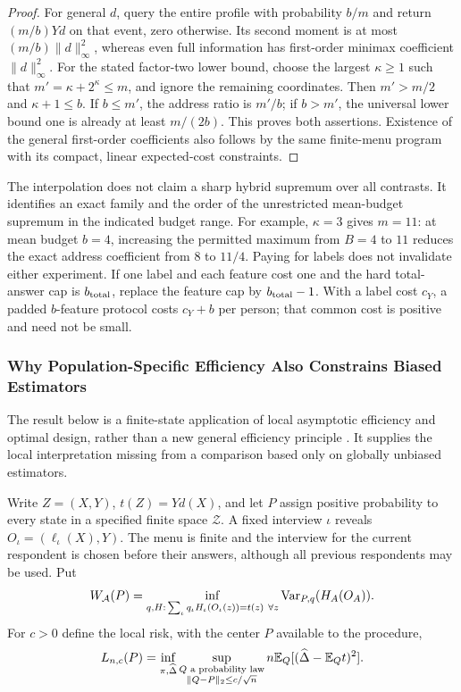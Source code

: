 \begin{proof}
For general $d$, query the entire profile with probability $b/m$ and return
$(m/b)Yd$ on that event, zero otherwise. Its second moment is at most
$(m/b)\|d\|_\infty^2$, whereas even full information has first-order minimax
coefficient $\|d\|_\infty^2$. For the stated factor-two lower bound, choose
the largest $\kappa\ge1$ such that $m'=\kappa+2^\kappa\le m$, and ignore the remaining
coordinates. Then $m'>m/2$ and $\kappa+1\le b$. If $b\le m'$, the address ratio
is $m'/b$; if $b>m'$, the universal lower bound one is already at least
$m/(2b)$. This proves both assertions. Existence of the general
first-order coefficients also follows by the same finite-menu program with
its compact, linear expected-cost constraints.
\end{proof}

The interpolation does not claim a sharp hybrid supremum over all contrasts.
It identifies an exact family and the order of the unrestricted mean-budget
supremum in the indicated budget range. For example, $\kappa=3$ gives $m=11$:
at mean budget $b=4$, increasing the permitted maximum from $B=4$ to $11$
reduces the exact address coefficient from $8$ to $11/4$. Paying for labels
does not invalidate either experiment. If one label and each feature cost
one and the hard total-answer cap is $b_{\rm total}$, replace the feature
cap by $b_{\rm total}-1$. With a label cost $c_Y$, a padded $b$-feature
protocol costs $c_Y+b$ per person; that common cost is positive and need not
be small.

\subsubsection{Why Population-Specific Efficiency Also Constrains Biased Estimators}
\label{app:localminimax}
The result below is a finite-state application of local asymptotic efficiency
and optimal design, rather than a new general efficiency principle
\citep{robins1994,tsiatis2006,hahn2011,barnes2020}. It supplies the local
interpretation missing from a comparison based only on globally unbiased
estimators.

Write $Z=(X,Y)$, $t(Z)=Yd(X)$, and let $P$ assign positive probability to
every state in a specified finite space $\mathcal Z$. A fixed interview
$\iota$ reveals $O_\iota=(\ell_\iota(X),Y)$. The menu is finite and the interview for
the current respondent is chosen before their answers, although all previous
respondents may be used. Put
\[
 W_{\mathcal A}(P)=\inf_{q,H:\,\sum_\iota q_\iota H_\iota(O_\iota(z))=t(z)\ \forall z}
                      \operatorname{Var}_{P,q}(H_A(O_A)).
\]
For $c>0$ define the local risk, with the center $P$ available to the procedure,
\[
 L_{n,c}(P)=\inf_{\pi,\widehat\Delta}
       \sup_{\substack{Q\text{ a probability law}\\
                        \|Q-P\|_2\le c/\sqrt n}}
       n\mathbb{E}_Q[(\widehat\Delta-\mathbb{E}_Qt)^2].
\]

